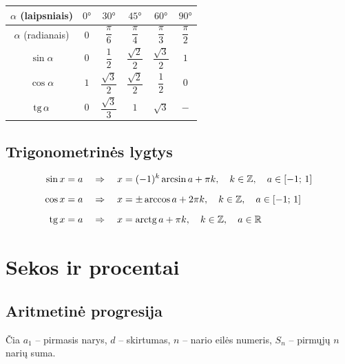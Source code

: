 \begin{center}
\begin{tabular}{|c|c|c|c|c|c|}
\hline
$\alpha$ (laipsniais) & $0°$ & $30°$ & $45°$ & $60°$ & $90°$ \\
\hline
$\alpha$ (radianais)  & $0$ & $\dfrac{\pi}{6}$ & $\dfrac{\pi}{4}$ & $\dfrac{\pi}{3}$ & $\dfrac{\pi}{2}$ \\[8pt]
\hline
$\sin\alpha$ & $0$ & $\dfrac{1}{2}$ & $\dfrac{\sqrt{2}}{2}$ & $\dfrac{\sqrt{3}}{2}$ & $1$ \\[8pt]
\hline
$\cos\alpha$ & $1$ & $\dfrac{\sqrt{3}}{2}$ & $\dfrac{\sqrt{2}}{2}$ & $\dfrac{1}{2}$ & $0$ \\[8pt]
\hline
$\operatorname{tg}\alpha$  & $0$ & $\dfrac{\sqrt{3}}{3}$ & $1$ & $\sqrt{3}$ & $-$ \\[8pt]
\hline
\end{tabular}
\end{center}

\subsection{Trigonometrinės lygtys}

\begin{tcolorbox}[colback=orange!5!white, colframe=orange!60!black, title=Trigonometrinių lygčių sprendiniai]
\begin{align}
\sin x = a \quad &\Rightarrow \quad x = (-1)^k \arcsin a + \pi k, \quad k \in \mathbb{Z},
    \quad a \in [-1;\,1] \\[6pt]
\cos x = a \quad &\Rightarrow \quad x = \pm\arccos a + 2\pi k, \quad k \in \mathbb{Z},
    \quad a \in [-1;\,1] \\[6pt]
\operatorname{tg} x = a  \quad &\Rightarrow \quad x = \operatorname{arctg} a + \pi k, \quad k \in \mathbb{Z},
    \quad a \in \mathbb{R}
\end{align}
\end{tcolorbox}

\section{Sekos ir procentai}

\subsection{Aritmetinė progresija}

Čia $a_1$ – pirmasis narys, $d$ – skirtumas, $n$ – nario eilės numeris,
$S_n$ – pirmųjų $n$ narių suma.

